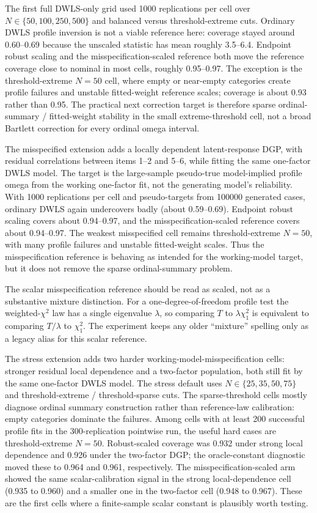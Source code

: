 \documentclass[11pt]{article}
\theoremstyle{plain}
\theoremstyle{remark}
\begin{document}
The first full DWLS-only grid used 1000 replications per cell over
$N\in\{50,100,250,500\}$ and balanced versus threshold-extreme cuts. Ordinary
DWLS profile inversion is not a viable reference here: coverage stayed around
0.60--0.69 because the unscaled statistic has mean roughly 3.5--6.4. Endpoint
robust scaling and the misspecification-scaled reference both move the reference
coverage close to nominal in most cells, roughly 0.95--0.97. The exception is
the threshold-extreme $N=50$ cell, where empty or near-empty categories create
profile failures and unstable fitted-weight reference scales; coverage is about
0.93 rather than 0.95. The practical next correction target is therefore sparse
ordinal-summary / fitted-weight stability in the small extreme-threshold cell,
not a broad Bartlett correction for every ordinal omega interval.

The misspecified extension adds a locally dependent latent-response DGP, with
residual correlations between items 1--2 and 5--6, while fitting the same
one-factor DWLS model. The target is the large-sample pseudo-true
model-implied profile omega from the working one-factor fit, not the generating
model's reliability. With 1000 replications per cell and pseudo-targets from
100000 generated cases, ordinary DWLS again undercovers badly
(about 0.59--0.69). Endpoint robust scaling covers about 0.94--0.97, and the
misspecification-scaled reference covers about 0.94--0.97. The weakest
misspecified cell remains threshold-extreme $N=50$, with many profile failures
and unstable fitted-weight scales. Thus the misspecification reference is
behaving as intended for the working-model target, but it does not remove the
sparse ordinal-summary problem.

The scalar misspecification reference should be read as scaled, not as a
substantive mixture distinction. For a one-degree-of-freedom profile test the
weighted-\(\chi^2\) law has a single eigenvalue \(\lambda\), so comparing
\(T\) to \(\lambda\chi^2_1\) is equivalent to comparing \(T/\lambda\) to
\(\chi^2_1\). The experiment keeps any older ``mixture'' spelling only as a
legacy alias for this scalar reference.

The stress extension adds two harder working-model-misspecification cells:
stronger residual local dependence and a two-factor population, both still fit
by the same one-factor DWLS model. The stress default uses
\(N\in\{25,35,50,75\}\) and threshold-extreme / threshold-sparse cuts. The
sparse-threshold cells mostly diagnose ordinal summary construction rather than
reference-law calibration: empty categories dominate the failures. Among cells
with at least 200 successful profile fits in the 300-replication pointwise run,
the useful hard cases are threshold-extreme \(N=50\). Robust-scaled coverage was
0.932 under strong local dependence and 0.926 under the two-factor DGP; the
oracle-constant diagnostic moved these to 0.964 and 0.961, respectively. The
misspecification-scaled arm showed the same scalar-calibration signal in the
strong local-dependence cell (0.935 to 0.960) and a smaller one in the two-factor
cell (0.948 to 0.967). These are the first cells where a finite-sample scalar
constant is plausibly worth testing.
\end{document}
